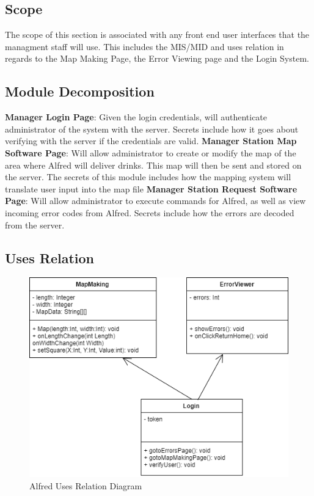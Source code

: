 \documentclass [10pt]{article}
\begin{document}
\subsection{Scope}

The scope of this section is associated with any front end user interfaces that the managment staff will use. This includes the MIS/MID and uses relation in regards to the Map Making Page, the Error Viewing page and the Login System. 

\subsection{Module Decomposition}

\textbf{Manager Login Page}: Given the login credentials, will authenticate administrator of the system with the server. Secrets include how it goes about verifying with the server if the credentials are valid.
\textbf{Manager Station Map Software Page}: Will allow administrator to create or modify the map of the area where Alfred will deliver drinks. This map will then be sent and stored on the server. The secrets of this module includes how the mapping system will translate user input into the map file
\textbf{Manager Station Request Software Page}: Will allow administrator to execute commands for Alfred, as well as view incoming error codes from Alfred. Secrets include how the errors are decoded from the server.

\subsection{Uses Relation}

\begin{figure} [h!]
	\centering
	\includegraphics [scale = 0.4] {figures/Manager_UsesDiagram.png}
	\caption{Alfred Uses Relation Diagram}
\end{figure}
\end{document}
